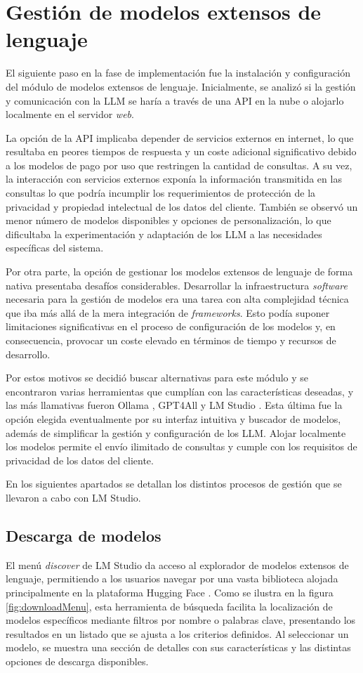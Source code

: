 \section{Gestión de modelos extensos de lenguaje}
El siguiente paso en la fase de implementación fue la instalación
y configuración del módulo de modelos extensos de lenguaje.
Inicialmente, se analizó si la gestión y comunicación con la LLM se haría a través de una
API en la nube o alojarlo localmente en el servidor \textit{web}.

La opción de la API implicaba depender de servicios externos
en internet, lo que resultaba en peores tiempos de respuesta y un coste adicional significativo
debido a los modelos de pago por uso que restringen la cantidad de consultas.
A su vez, la interacción con servicios externos exponía la información transmitida en las consultas
lo que podría incumplir los requerimientos de protección de la privacidad
y propiedad intelectual de los datos del cliente.
También se observó un menor número de modelos disponibles y opciones de personalización,
lo que dificultaba la experimentación y adaptación de los LLM a las necesidades específicas del sistema.

Por otra parte, la opción de gestionar los modelos extensos de lenguaje
de forma nativa presentaba desafíos considerables.
Desarrollar la infraestructura \textit{software} necesaria para la gestión de modelos
era una tarea con alta complejidad técnica que iba más allá de la mera integración de \textit{frameworks}.
Esto podía suponer limitaciones significativas en el proceso de configuración de los modelos y,
en consecuencia, provocar un coste elevado en términos de tiempo y recursos de desarrollo.

Por estos motivos se decidió buscar alternativas para este módulo y se encontraron varias herramientas que
cumplían con las características deseadas, y las más llamativas fueron
Ollama \cite{ollama}, GPT4All \cite{gpt4all} y LM Studio \cite{lmstudio}.
Esta última fue la opción elegida eventualmente por su interfaz intuitiva y buscador de modelos,
además de simplificar la gestión y configuración de los LLM.
Alojar localmente los modelos permite el envío ilimitado de consultas
y cumple con los requisitos de privacidad de los datos del cliente.

En los siguientes apartados se detallan los distintos procesos de gestión que se llevaron a cabo con LM Studio.

\subsection{Descarga de modelos}
El menú \textit{discover} de LM Studio da acceso al explorador de modelos extensos de lenguaje,
permitiendo a los usuarios navegar por una vasta biblioteca alojada principalmente en la plataforma Hugging Face \cite{huggingface}.
Como se ilustra en la figura \ref{fig:downloadMenu},
esta herramienta de búsqueda facilita la localización de modelos específicos mediante filtros por nombre o palabras clave,
presentando los resultados en un listado que se ajusta a los criterios definidos.
Al seleccionar un modelo, se muestra una sección de detalles con sus características y las distintas opciones de descarga disponibles.

